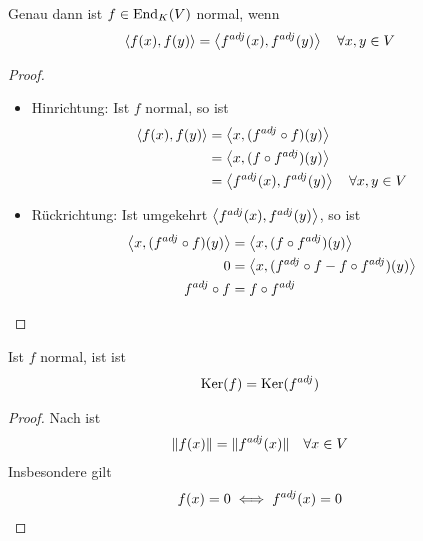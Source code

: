 \begin{lemma}
	Genau dann ist $f\in\operatorname{End}_K(V)$ normal, wenn
	\begin{align}
		\left\langle f(x),f(y)\right\rangle=\left\langle f^{adj}(x),f^{adj}(y)\right\rangle\quad\forall x,y\in V\notag
	\end{align}
\end{lemma}
\begin{proof}
	\begin{itemize}
		\item Hinrichtung: Ist $f$ normal, so ist
		\begin{align}
			\left\langle f(x),f(y)\right\rangle &= \left\langle x,(f^{adj}\circ f)(y)\right\rangle \notag \\
			&= \left\langle x,(f\circ f^{adj})(y)\right\rangle \notag \\
			&= \left\langle f^{adj}(x),f^{adj}(y)\right\rangle\quad\forall x,y\in V\notag
		\end{align}
		\item Rückrichtung: Ist umgekehrt $\left\langle f^{adj}(x),f^{adj}(y)\right\rangle$, so ist
		\begin{align}
			\left\langle x,(f^{adj}\circ f)(y)\right\rangle&=\left\langle x,(f\circ f^{adj})(y)\right\rangle \notag \\
			0 &= \left\langle x,(f^{adj}\circ f-f\circ f^{adj})(y)\right\rangle \notag \\
			f^{adj}\circ f&=f\circ f^{adj} \notag
		\end{align}
	\end{itemize}
\end{proof}

\begin{lemma}
	Ist $f$ normal, ist ist
	\begin{align}
		\operatorname{Ker}(f)=\operatorname{Ker}(f^{adj})\notag
	\end{align}
\end{lemma}
\begin{proof}
	Nach  ist
	\begin{align}
		\Vert f(x)\Vert = \Vert f^{adj}(x)\Vert \quad\forall x\in V\notag
	\end{align}
	Insbesondere gilt
	\begin{align}
		f(x)=0\iff f^{adj}(x)=0\notag
	\end{align}
\end{proof}

